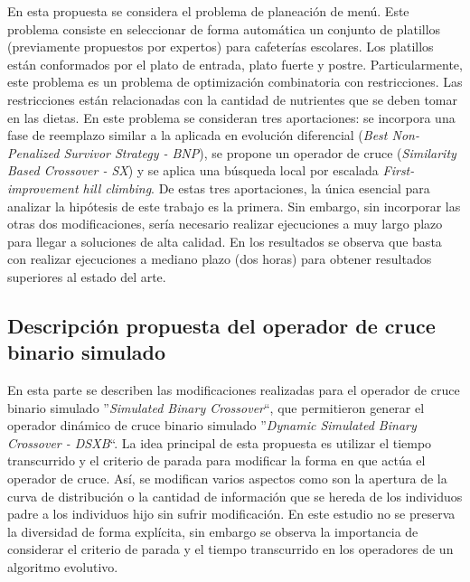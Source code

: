 En esta propuesta se considera el problema de planeación de menú.
%
Este problema consiste en seleccionar de forma automática un conjunto de platillos (previamente propuestos por expertos) 
para cafeterías escolares.
%
Los platillos están conformados por el plato de entrada, plato fuerte y postre. 
%
Particularmente, este problema es un problema de optimización combinatoria con restricciones.
%
Las restricciones están relacionadas con la cantidad de nutrientes que se deben tomar en las dietas.
%
En este problema se consideran tres aportaciones: se incorpora una fase de reemplazo similar a la aplicada en evolución 
diferencial (\textit{Best Non-Penalized Survivor Strategy - BNP}), se propone un operador de cruce 
(\textit{Similarity Based Crossover - SX}) y se aplica una búsqueda local por escalada \textit{First-improvement hill climbing}.
%
De estas tres aportaciones, la única esencial para analizar la hipótesis de este trabajo es la primera.
%
Sin embargo, sin incorporar las otras dos modificaciones, sería necesario realizar ejecuciones a muy largo plazo para llegar
a soluciones de alta calidad.
%
En los resultados se observa que basta con realizar ejecuciones a mediano plazo (dos horas) para obtener resultados 
superiores al estado del arte.

\subsection{Descripción propuesta del operador de cruce binario simulado}

En esta parte se describen las modificaciones realizadas para el operador de cruce binario simulado 
''\textit{Simulated Binary Crossover}``, que permitieron generar el operador dinámico de cruce binario simulado 
''\textit{Dynamic Simulated Binary Crossover - DSXB}``.
%
La idea principal de esta propuesta es utilizar el tiempo transcurrido y el criterio de parada para modificar la forma
en que actúa el operador de cruce.
%
Así, se modifican varios aspectos como son la apertura de la curva de distribución o la cantidad de información que se hereda 
de los individuos padre a los individuos hijo sin sufrir modificación.
%
En este estudio no se preserva la diversidad de forma explícita, sin embargo se observa la importancia de considerar el 
criterio de parada y el tiempo transcurrido en los operadores de un algoritmo evolutivo.
